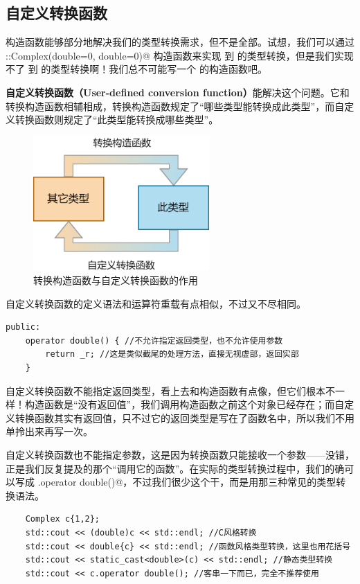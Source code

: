 \subsection*{自定义转换函数}
构造函数能够部分地解决我们的类型转换需求，但不是全部。试想，我们可以通过 \lstinline@Complex::Complex(double={0}, double={0})@ 构造函数来实现 \lstinline@double@ 到 \lstinline@Complex@ 的类型转换，但是我们实现不了 \lstinline@Complex@ 到 \lstinline@double@ 的类型转换啊！我们总不可能写一个 \lstinline@double@ 的构造函数吧。\par
\textbf{自定义转换函数（User-defined conversion function）}能解决这个问题。它和转换构造函数相辅相成，转换构造函数规定了``哪些类型能转换成此类型''，而自定义转换函数则规定了``此类型能转换成哪些类型''。
\begin{figure}[htbp]
    \centering
    \includegraphics[width=0.6\textwidth]{../images/generalized_parts/08_type_conversion_between_classes.drawio.png}
    \caption{转换构造函数与自定义转换函数的作用}
\end{figure}
自定义转换函数的定义语法和运算符重载有点相似，不过又不尽相同。
\begin{lstlisting}
public:
    operator double() { //不允许指定返回类型，也不允许使用参数
        return _r; //这是类似截尾的处理方法，直接无视虚部，返回实部
    }
\end{lstlisting}
自定义转换函数不能指定返回类型，看上去和构造函数有点像，但它们根本不一样！构造函数是``没有返回值''，我们调用构造函数之前这个对象已经存在；而自定义转换函数其实有返回值，只不过它的返回类型是写在了函数名中，所以我们不用单拎出来再写一次。\par
自定义转换函数也不能指定参数，这是因为转换函数只能接收一个参数——没错，正是我们反复提及的那个``调用它的函数''。在实际的类型转换过程中，我们的确可以写成 \lstinline@c.operator double()@，不过我们很少这个干，而是用那三种常见的类型转换语法。
\begin{lstlisting}
    Complex c{1,2};
    std::cout << (double)c << std::endl; //C风格转换
    std::cout << double{c} << std::endl; //函数风格类型转换，这里也用花括号
    std::cout << static_cast<double>(c) << std::endl; //静态类型转换
    std::cout << c.operator double(); //客串一下而已，完全不推荐使用
\end{lstlisting}\par
